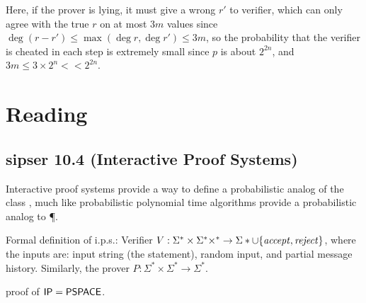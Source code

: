 \documentclass{article}
\begin{document}
Here, if the prover is lying, it must give a wrong \(r'\) to verifier, which can only agree with the true \(r\) on at most \(3m\) values since \(\deg(r - r') \leq \max(\deg r, \deg r') \leq 3m\), so the probability that the verifier is cheated in each step is extremely small since \(p\) is about \(2^{2n}\), and \(3m \leq 3 \times 2^n << 2^{2n}\).

\section{Reading}

\subsection{sipser 10.4 (Interactive Proof Systems)}

Interactive proof systems provide a way to define a probabilistic analog of the class \NP, much like probabilistic polynomial time algorithms provide a probabilistic analog to \P.

Formal definition of i.p.s.: Verifier \(V: \Sigma^* \times \Sigma^* \times^* \to \Sigma* \cup \lbrace\it accept, reject\rbrace\), where the inputs are: input string (the statement), random input, and partial message history. Similarly, the prover \(P: \Sigma^* \times \Sigma^* \to \Sigma^*\).

proof of \(\text{\sf IP} = \text{\sf PSPACE}\).
\end{document}
